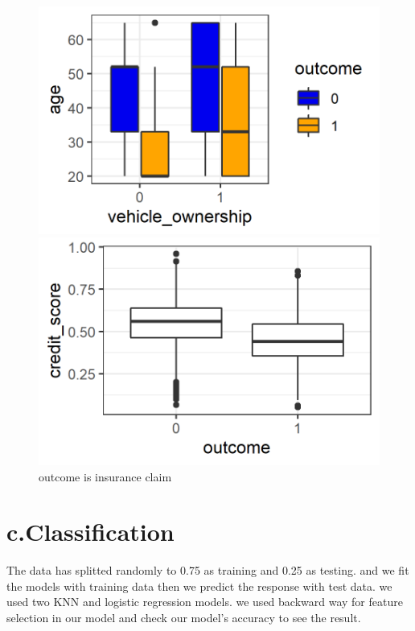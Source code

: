 \documentclass[a4paper, 11pt]{article}
\begin{document}
\begin{figure}[H]
\begin{minipage}[b]{0.4\textwidth}
		\caption{}
	\end{minipage}
	\hfill
	\begin{minipage}[b]{0.4\textwidth}
	\includegraphics[width=\textwidth]{figure4.png}
	\caption{}
     \end{minipage}
 	\begin{minipage}[b]{0.4\textwidth}
 	\includegraphics[width=\textwidth]{figure5.png}
 	\caption{outcome is insurance claim}
 \end{minipage}
\end{figure}


\section*{c.Classification}	
The data has splitted randomly to 0.75 as training and 0.25 as testing. and we fit the models with training data then we predict the response with test data. we used two KNN and logistic regression models. we used backward way for feature selection in our model and check our model's accuracy to see the result.
\end{document}
